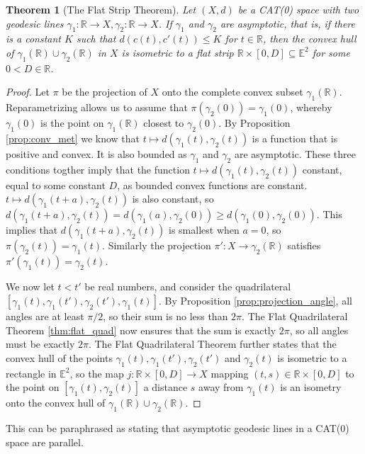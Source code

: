 \documentclass[11pt, a4paper, oneside]{memoir}
\theoremstyle{plain}\newtheorem{theorem}[subsection]{Theorem}
\theoremstyle{definition}
\newcommand{\E}{\mathbb{E}}
\newcommand{\R}{\mathbb{R}}
\begin{document}
\begin{theorem}[The Flat Strip Theorem]\label{thm:flat_strip}
    Let \((X,d)\) be a CAT(0) space with two geodesic lines \(\gamma_1:\R\to X,\gamma_2:\R\to X\).
    If \(\gamma_1\) and \(\gamma_2\) are asymptotic, that is, if there is a constant \(K\) such that \(d(c(t),c'(t))\leq K\) for \(t\in\R\), then the convex hull of \(\gamma_1(\R)\cup\gamma_2(\R)\) in \(X\) is isometric to a flat strip \(\R\times [0,D]\subseteq\E^2\) for some \(0<D\in\R\).
\end{theorem}
\begin{proof}
Let \(\pi\) be the projection of \(X\) onto the complete convex subset \(\gamma_1(\R)\).
Reparametrizing allows us to assume that \(\pi(\gamma_2(0))=\gamma_1(0)\), whereby \(\gamma_1(0)\) is the point on \(\gamma_1(\R)\) closest to \(\gamma_2(0)\).
By Proposition \ref{prop:conv_met} we know that \(t\mapsto d(\gamma_1(t),\gamma_2(t))\) is a function that is positive and convex.
It is also bounded as \(\gamma_1\) and \(\gamma_2\) are asymptotic.
These three conditions togther imply that the function \(t\mapsto d(\gamma_1(t),\gamma_2(t))\) constant, equal to some constant \(D\), as bounded convex functions are constant.
\(t\mapsto d(\gamma_1(t+a),\gamma_2(t))\) is also constant, so \(d(\gamma_1(t+a),\gamma_2(t))=d(\gamma_1(a),\gamma_2(0))\geq d(\gamma_1(0),\gamma_2(0))\).
This implies that \(d(\gamma_1(t+a),\gamma_2(t))\) is smallest when \(a=0\), so \(\pi(\gamma_2(t))=\gamma_1(t)\).
Similarly the projection \(\pi':X\to \gamma_2(\R)\) satisfies \(\pi'(\gamma_1(t))=\gamma_2(t)\).

We now let \(t<t'\) be real numbers, and consider the quadrilateral \([\gamma_1(t),\gamma_1(t'),\gamma_2(t'),\gamma_1(t)]\).
By Proposition \ref{prop:projection_angle}, all angles are at least \(\pi/2\), so their sum is no less than \(2\pi\).
The Flat Quadrilateral Theorem \ref{thm:flat_quad} now ensures that the sum is exactly \(2\pi\), so all angles must be exactly \(2\pi\).
The Flat Quadrilateral Theorem further states that the convex hull of the points \(\gamma_1(t),\gamma_1(t'),\gamma_2(t')\) and \(\gamma_2(t)\) is isometric to a rectangle in \(\E^2\), so the map \(j:\R\times[0,D]\to X\) mapping \((t,s)\in \R\times[0,D]\) to the point on \([\gamma_1(t),\gamma_2(t)]\) a distance \(s\) away from \(\gamma_1(t)\) is an isometry onto the convex hull of \(\gamma_1(\R)\cup\gamma_2(\R)\).
\end{proof}
This can be paraphrased as stating that asymptotic geodesic lines in a CAT(0) space are parallel.
\end{document}
